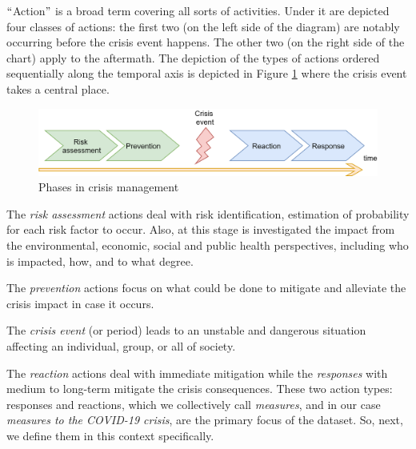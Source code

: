 $``$Action$"$  is a broad term covering all sorts of activities. Under it are depicted four classes of actions: the first two (on the left side of the diagram) are notably occurring before the crisis event happens. The other two (on the right side of the chart) apply to the aftermath. The depiction of the types of actions ordered sequentially along the temporal axis is depicted in Figure \ref{fig:Phases_in_crisis_management} where the crisis event takes a central place. 

\begin{Center}

\begin{figure}[H]
	\begin{Center}
		\includegraphics[width=\textwidth]{images/image4.png}
		\caption{Phases in crisis management}
		\label{fig:Phases_in_crisis_management}
	\end{Center}
\end{figure}
\end{Center}

The \textit{risk assessment} actions deal with risk identification, estimation of probability for each risk factor to occur. Also, at this stage is investigated the impact from the environmental, economic, social and public health perspectives, including who is impacted, how, and to what degree. 

The \textit{prevention} actions focus on what could be done to mitigate and alleviate the crisis impact in case it occurs. 

The \textit{crisis event} (or period) leads to an unstable and dangerous situation affecting an individual, group, or all of society. 

The \textit{reaction} actions deal with immediate mitigation while the \textit{responses} with medium to long-term mitigate the crisis consequences. These two action types: responses and reactions, which we collectively call \textit{measures}, and in our case \textit{measures to the COVID-19 crisis}, are the primary focus of the dataset. So, next, we define them in this context specifically. 


